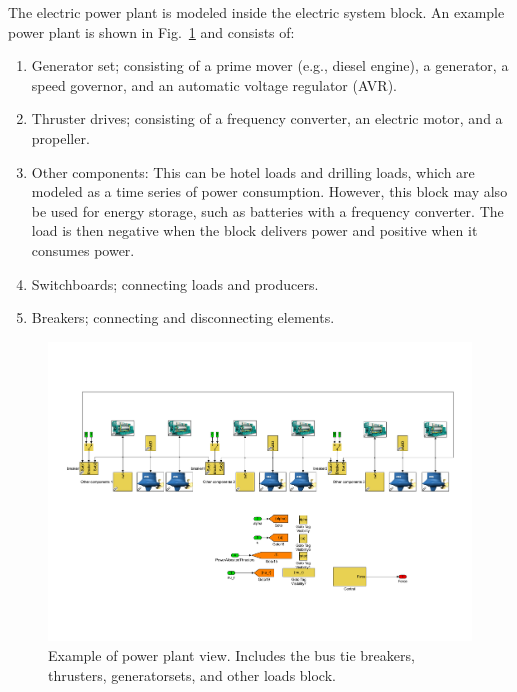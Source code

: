 \documentclass[twocolumn,10pt]{asme2e}
\begin{document}
The electric power plant is modeled inside the electric system block.
An example power plant is shown in Fig.~\ref{fig:PowerPlantsscheme} and consists of:
\begin{enumerate}
\item Generator set; consisting of a prime mover (e.g., diesel engine), a generator, a speed governor, and an automatic voltage regulator (AVR).
\item Thruster drives; consisting of a frequency converter, an electric motor, and a propeller.
\item Other components: This can be hotel loads and drilling loads, which are modeled as a time series of power consumption. However, this block may also be used for energy storage, such as batteries with a frequency converter. The load is then negative when the block delivers power and positive when it consumes power.
\item Switchboards; connecting loads and producers.
\item Breakers; connecting and disconnecting elements.
\end{enumerate}


\begin{figure}[t!]
\centering
\includegraphics[trim=30 280 30 80,width=\textwidth,clip]{./figures/elscheme.pdf}
\caption{Example of power plant view. Includes the bus tie breakers, thrusters, generatorsets, and other loads block.}
\label{fig:PowerPlantsscheme}
\end{figure}
\end{document}
